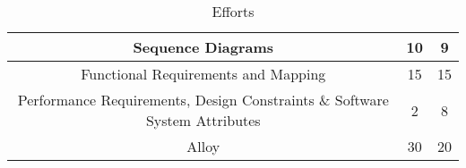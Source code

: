 \begin{table}[ht]
\begin{tabular}{|c|c|c|}
Sequence Diagrams                                                                        &10          & 9         \\ \hline
Functional Requirements and Mapping                                                      & 15          & 15          \\ \hline
Performance Requirements, Design Constraints \& Software System Attributes              & 2          & 8          \\ \hline
Alloy                                                                                   & 30          & 20          \\ \hline
\end{tabular}
\caption{Efforts}
\end{table}
